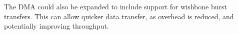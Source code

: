 The DMA could also be expanded to include support for wishbone burst transfers. This can allow quicker data
transfer, as overhead is reduced, and potentially improving throughput.


%
%


%

